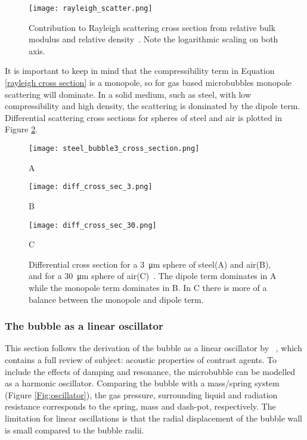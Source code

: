 \begin{figure}[h]
  \centering
  \texttt{[image: rayleigh\_scatter.png]}
  \caption{Contribution to Rayleigh scattering cross section from relative bulk modulus and relative density~\cite{Hoff2000}. Note the logarithmic scaling on both axis.}
  \label{Fig:rayleigh}
\end{figure} 

It is important to keep in mind that the compressibility term in Equation \ref{rayleigh cross section} is a monopole, so for gas based microbubbles monopole scattering will dominate. In a solid medium, such as steel, with low compressibility and high density, the scattering is dominated by the dipole term. Differential scattering cross sections for spheres of steel and air is plotted in Figure \ref{fig:diff cross_sec}.
\begin{figure}[h]
	\centering
	    \begin{minipage}[b]{0.3\textwidth}
			\texttt{[image: steel\_bubble3\_cross\_section.png]}
			    \caption{A}
                \label{fig:diff cross sec_steel}
		\end{minipage}%
    	\begin{minipage}[b]{0.3\textwidth}
			\texttt{[image: diff\_cross\_sec\_3.png]}
			    \caption{B}
                \label{fig:diff cross sec_air}
		\end{minipage}%
		\begin{minipage}[b]{0.3\textwidth}
			\texttt{[image: diff\_cross\_sec\_30.png]}
			    \caption{C}
                \label{fig:diff cross sec air_30}
		\end{minipage}%
		
  \caption{Differential cross section for a \SI{3}{\micro\meter} sphere of steel(A) and air(B), and for a \SI{30}{\micro\meter} sphere of air(C)~\cite{Healey2012}. The dipole term dominates in A while the monopole term dominates in B. In C there is more of a balance between the monopole and dipole term.}
  \label{fig:diff cross_sec}
\end{figure} 




\subsubsection{The bubble as a linear oscillator}
This section follows the derivation of the bubble as a linear oscillator by ~\citet{Hoff2000}, which contains a full review of subject: acoustic properties of contrast agents. To include the effects of damping and resonance, the microbubble can be modelled as a harmonic oscillator. Comparing the bubble with a mass/spring system (Figure \ref{Fig:oscillator}), the gas pressure, surrounding liquid and radiation resistance corresponds to the spring, mass and dash-pot, respectively. The limitation for linear oscillations is that the radial displacement of the bubble wall is small compared to the bubble radii. 

